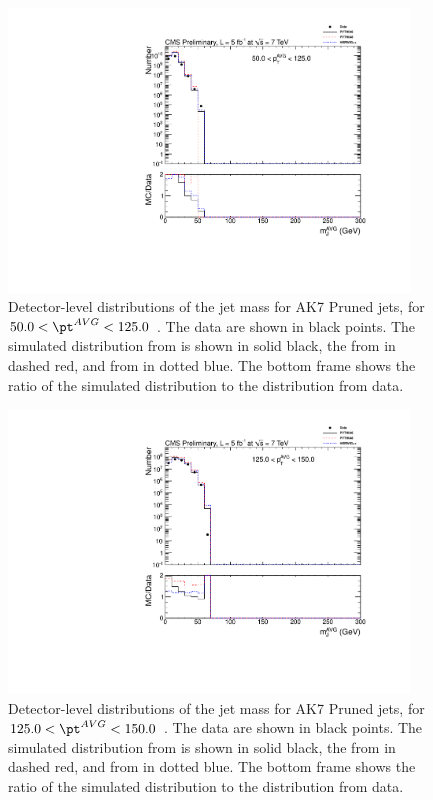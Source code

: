 \clearpage



\begin{figure}[htbp]
\centering
\includegraphics[width=0.95\textwidth]{figs/histAK7MjetVsPtAvg_rawDataMCComparisons_pt_1_Pruned}
\caption{Detector-level distributions of the jet mass for AK7 Pruned jets,
for $50.0 < \pt^{AVG} < 125.0$ \GeVc. The data are shown in black points.
The simulated distribution from \PYTHIA is shown in solid black, 
the from \PYTHIAEIGHT in dashed red, and from \HERWIG in dotted blue. 
The bottom frame shows the ratio of the simulated distribution
to the distribution from data. 
\label{figs:histAK7MjetVsPtAvg_rawDataMCComparisons_pt_1_Pruned}}
\end{figure}



\begin{figure}[htbp]
\centering
\includegraphics[width=0.95\textwidth]{figs/histAK7MjetVsPtAvg_rawDataMCComparisons_pt_2_Pruned}
\caption{Detector-level distributions of the jet mass for AK7 Pruned jets,
for $125.0 < \pt^{AVG} < 150.0$ \GeVc. The data are shown in black points.
The simulated distribution from \PYTHIA is shown in solid black, 
the from \PYTHIAEIGHT in dashed red, and from \HERWIG in dotted blue. 
The bottom frame shows the ratio of the simulated distribution
to the distribution from data. 
\label{figs:histAK7MjetVsPtAvg_rawDataMCComparisons_pt_2_Pruned}}
\end{figure}



